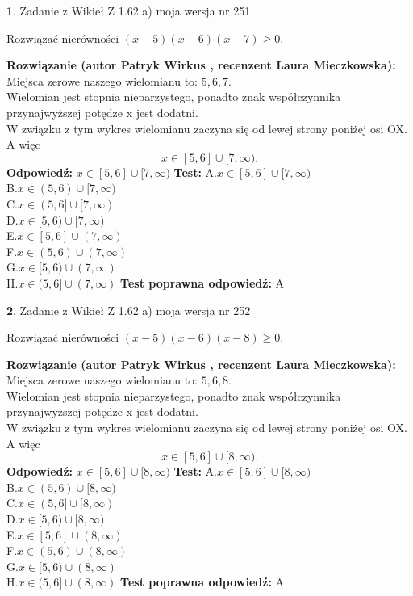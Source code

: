\documentclass[12pt, a4paper]{article}
\theoremstyle{definition} %
\newtheorem{zad}{}
\newcommand{\zadStart}[1]{\begin{zad}#1\newline}
\newcommand{\zadStop}{\end{zad}}
\newcommand{\rozwStart}[2]{\noindent \textbf{Rozwiązanie (autor #1 , recenzent #2): }\newline}
\newcommand{\rozwStop}{\newline}
\newcommand{\odpStart}{\noindent \textbf{Odpowiedź:}\newline}
\newcommand{\odpStop}{\newline}
\newcommand{\testStart}{\noindent \textbf{Test:}\newline}
\newcommand{\testStop}{\newline}
\newcommand{\kluczStart}{\noindent \textbf{Test poprawna odpowiedź:}\newline}
\newcommand{\kluczStop}{\newline}
\begin{document}
\zadStart{Zadanie z Wikieł Z 1.62 a) moja wersja nr 251}

Rozwiązać nierówności $(x-5)(x-6)(x-7)\ge0$.
\zadStop
\rozwStart{Patryk Wirkus}{Laura Mieczkowska}
Miejsca zerowe naszego wielomianu to: $5, 6, 7$.\\
Wielomian jest stopnia nieparzystego, ponadto znak współczynnika przy\linebreak najwyższej potędze x jest dodatni.\\ W związku z tym wykres wielomianu zaczyna się od lewej strony poniżej osi OX. A więc $$x \in [5,6] \cup [7,\infty).$$
\rozwStop
\odpStart
$x \in [5,6] \cup [7,\infty)$
\odpStop
\testStart
A.$x \in [5,6] \cup [7,\infty)$\\
B.$x \in (5,6) \cup [7,\infty)$\\
C.$x \in (5,6] \cup [7,\infty)$\\
D.$x \in [5,6) \cup [7,\infty)$\\
E.$x \in [5,6] \cup (7,\infty)$\\
F.$x \in (5,6) \cup (7,\infty)$\\
G.$x \in [5,6) \cup (7,\infty)$\\
H.$x \in (5,6] \cup (7,\infty)$
\testStop
\kluczStart
A
\kluczStop



\zadStart{Zadanie z Wikieł Z 1.62 a) moja wersja nr 252}

Rozwiązać nierówności $(x-5)(x-6)(x-8)\ge0$.
\zadStop
\rozwStart{Patryk Wirkus}{Laura Mieczkowska}
Miejsca zerowe naszego wielomianu to: $5, 6, 8$.\\
Wielomian jest stopnia nieparzystego, ponadto znak współczynnika przy\linebreak najwyższej potędze x jest dodatni.\\ W związku z tym wykres wielomianu zaczyna się od lewej strony poniżej osi OX. A więc $$x \in [5,6] \cup [8,\infty).$$
\rozwStop
\odpStart
$x \in [5,6] \cup [8,\infty)$
\odpStop
\testStart
A.$x \in [5,6] \cup [8,\infty)$\\
B.$x \in (5,6) \cup [8,\infty)$\\
C.$x \in (5,6] \cup [8,\infty)$\\
D.$x \in [5,6) \cup [8,\infty)$\\
E.$x \in [5,6] \cup (8,\infty)$\\
F.$x \in (5,6) \cup (8,\infty)$\\
G.$x \in [5,6) \cup (8,\infty)$\\
H.$x \in (5,6] \cup (8,\infty)$
\testStop
\kluczStart
A
\kluczStop
\end{document}
